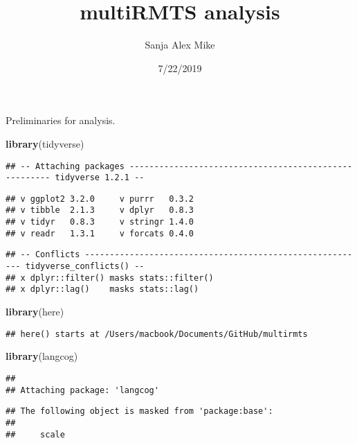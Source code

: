 \documentclass[]{article}
\title{multiRMTS analysis}
\author{Sanja Alex Mike}
\date{7/22/2019}
\newenvironment{Shaded}{\begin{snugshade}}{\end{snugshade}}
\newcommand{\KeywordTok}[1]{\textcolor[rgb]{0.13,0.29,0.53}{\textbf{#1}}}
\newcommand{\NormalTok}[1]{#1}
\begin{document}
\maketitle

Preliminaries for analysis.

\begin{Shaded}
\begin{Highlighting}[]
\KeywordTok{library}\NormalTok{(tidyverse)}
\end{Highlighting}
\end{Shaded}

\begin{verbatim}
## -- Attaching packages ------------------------------------------------------ tidyverse 1.2.1 --
\end{verbatim}

\begin{verbatim}
## v ggplot2 3.2.0     v purrr   0.3.2
## v tibble  2.1.3     v dplyr   0.8.3
## v tidyr   0.8.3     v stringr 1.4.0
## v readr   1.3.1     v forcats 0.4.0
\end{verbatim}

\begin{verbatim}
## -- Conflicts --------------------------------------------------------- tidyverse_conflicts() --
## x dplyr::filter() masks stats::filter()
## x dplyr::lag()    masks stats::lag()
\end{verbatim}

\begin{Shaded}
\begin{Highlighting}[]
\KeywordTok{library}\NormalTok{(here)}
\end{Highlighting}
\end{Shaded}

\begin{verbatim}
## here() starts at /Users/macbook/Documents/GitHub/multirmts
\end{verbatim}

\begin{Shaded}
\begin{Highlighting}[]
\KeywordTok{library}\NormalTok{(langcog)}
\end{Highlighting}
\end{Shaded}

\begin{verbatim}
## 
## Attaching package: 'langcog'
\end{verbatim}

\begin{verbatim}
## The following object is masked from 'package:base':
## 
##     scale
\end{verbatim}
\end{document}
